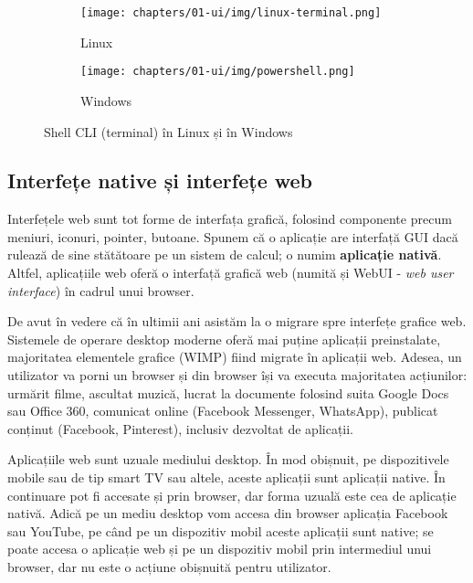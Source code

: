 \begin{figure}[!htbp]
  \centering
  \begin{subfigure}[b]{0.6\textwidth}
    \texttt{[image: chapters/01-ui/img/linux-terminal.png]}
    \caption{Linux}
    \label{fig:ui:shell-cli:linux}
  \end{subfigure}

  \begin{subfigure}[b]{0.6\textwidth}
    \texttt{[image: chapters/01-ui/img/powershell.png]}
    \caption{Windows}
    \label{fig:ui:shell-cli:windows}
  \end{subfigure}

  \caption{Shell CLI (terminal) în Linux și în Windows}
  \label{fig:ui:shell-cli-linux-windows}
\end{figure}

\newpage

\subsection{Interfețe native și interfețe web}
\label{sec:ui:native-web}

Interfețele web sunt tot forme de interfața grafică, folosind componente precum meniuri, iconuri, pointer, butoane. Spunem că o aplicație are interfață GUI dacă rulează de sine stătătoare pe un sistem de calcul; o numim \textbf{aplicație nativă}. Altfel, aplicațiile web oferă o interfață grafică web (numită și WebUI - \textit{web user interface}) în cadrul unui browser.

De avut în vedere că în ultimii ani asistăm la o migrare spre interfețe grafice web. Sistemele de operare desktop moderne oferă mai puține aplicații preinstalate, majoritatea elementele grafice (WIMP) fiind migrate în aplicații web. Adesea, un utilizator va porni un browser și din browser își va executa majoritatea acțiunilor: urmărit filme, ascultat muzică, lucrat la documente folosind suita Google Docs sau Office 360, comunicat online (Facebook Messenger, WhatsApp), publicat conținut (Facebook, Pinterest), inclusiv dezvoltat de aplicații.

Aplicațiile web sunt uzuale mediului desktop. În mod obișnuit, pe dispozitivele mobile sau de tip smart TV sau altele, aceste aplicații sunt aplicații native. În continuare pot fi accesate și prin browser, dar forma uzuală este cea de aplicație nativă. Adică pe un mediu desktop vom accesa din browser aplicația Facebook sau YouTube, pe când pe un dispozitiv mobil aceste aplicații sunt native; se poate accesa o aplicație web și pe un dispozitiv mobil prin intermediul unui browser, dar nu este o acțiune obișnuită pentru utilizator.

